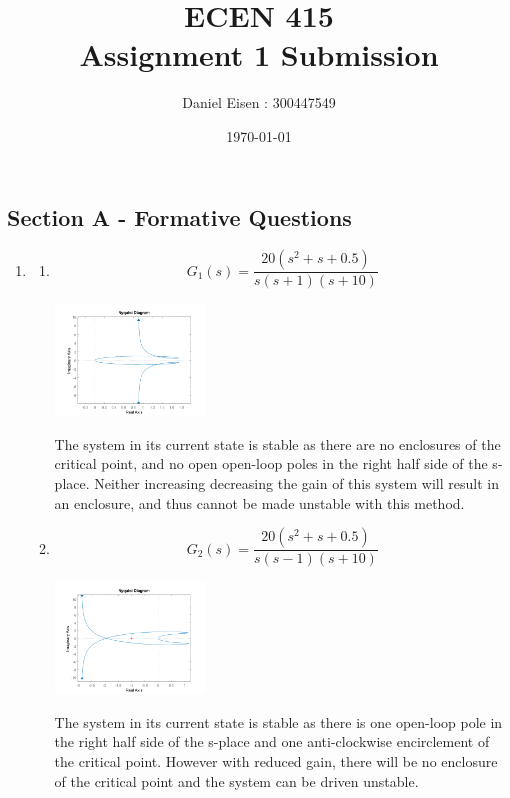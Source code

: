 \documentclass[11pt]{article}
\title{ECEN 415 \\ Assignment 1 Submission}
\author{Daniel Eisen : 300447549}
\date{\today}
\begin{document}
\begin{preview}
\maketitle

\section*{Section A - Formative Questions}
\begin{enumerate}
    \item 
    \begin{enumerate}
        \item 
        $$G_1(s) = \frac{20(s^2 + s + 0.5)}{s(s+1)(s+10)}$$
        \begin{center}
            \includegraphics[width=0.33\textwidth]{fig/1a.png}
        \end{center}
        The system in its current state is stable as there are no enclosures of the critical point, and no open open-loop poles in the right half side of the s-place. Neither increasing decreasing the gain of this system will result in an enclosure, and thus cannot be made unstable with this method.  
        \item 
        $$G_2(s) = \frac{20(s^2 + s + 0.5)}{s(s-1)(s+10)}$$
        \begin{center}
            \includegraphics[width=0.33\textwidth]{fig/1b.png}
        \end{center}
        The system in its current state is stable as there is one open-loop pole in the right half side of the s-place and one anti-clockwise encirclement of the critical point. However with reduced gain, there will be no enclosure of the critical point and the system can be driven unstable.

\end{enumerate}
\end{enumerate}
\end{preview}
\end{document}
